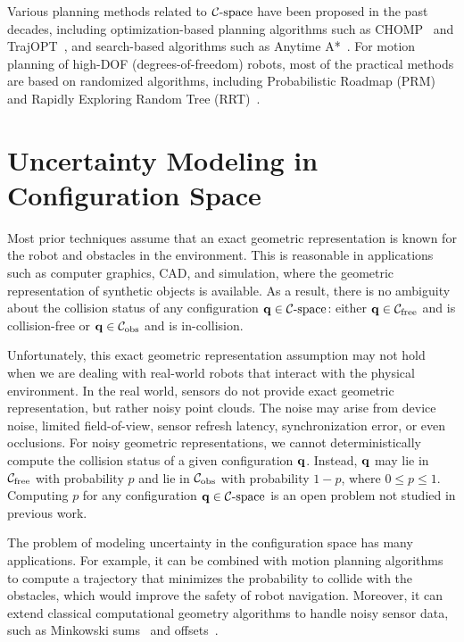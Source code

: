 Various planning methods related to $\mathcal C\text{-space}$ have been proposed in the past decades, including optimization-based planning algorithms such as CHOMP~\cite{Ratliff:2009} and TrajOPT~\cite{John:2013:FLO}, and search-based algorithms such as Anytime A*~\cite{Likhachev05anytimedynamic}. For motion planning of high-DOF (degrees-of-freedom) robots, most of the practical methods are based on randomized algorithms, including Probabilistic Roadmap (PRM)~\cite{Kavraki96} and Rapidly Exploring Random Tree (RRT)~\cite{Kuffner00}.


\section{Uncertainty Modeling in Configuration Space}
\label{sec:1:uncertainty}
Most prior techniques assume that an exact geometric representation is known for the robot and obstacles in the environment. This is reasonable in applications such as computer graphics, CAD, and simulation, where the geometric representation of synthetic objects is available. As a result, there is no ambiguity about the collision status of any configuration $\mathbf q \in \mathcal C\text{-space}$: either $\mathbf q \in \mathcal C_{\text{free}}$ and is collision-free or $\mathbf q \in \mathcal C_{\text{obs}}$ and is in-collision.

Unfortunately, this exact geometric representation assumption may not hold when we are dealing with real-world robots that interact with the physical environment. In the real world, sensors do not provide exact geometric representation, but rather noisy point clouds. The noise may arise from device noise, limited field-of-view, sensor refresh latency, synchronization error, or even occlusions. For noisy geometric representations, we cannot deterministically compute the collision status of a given configuration $\mathbf q$. Instead, $\mathbf q$ may lie in $\mathcal C_{\text{free}}$ with probability $p$ and lie in $\mathcal C_{\text{obs}}$ with probability $1-p$, where $0 \leq p \leq 1$. Computing $p$ for any configuration $\mathbf q \in \mathcal C\text{-space}$ is an open problem not studied in previous work.

The problem of modeling uncertainty in the configuration space has many applications. For example, it can be combined with motion planning algorithms to compute a trajectory that minimizes the probability to collide with the obstacles, which would improve the safety of robot navigation. Moreover, it can extend classical computational geometry algorithms to handle noisy sensor data, such as Minkowski sums~\cite{Varadhan:2006:TPA} and offsets~\cite{Choi:1997:CAD}.

